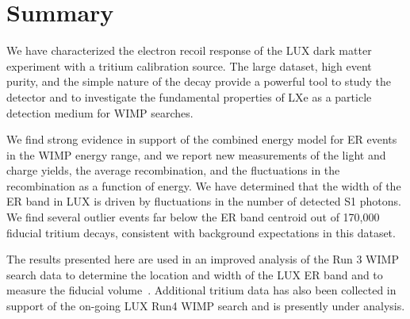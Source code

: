 \section{Summary}

We have characterized the electron recoil response of the LUX dark matter experiment with a tritium calibration source. The large dataset, high event purity, and the simple nature of the decay provide a powerful tool to study the detector and to investigate the fundamental properties of LXe as a particle detection medium for WIMP searches. 

We find strong evidence in support of the combined energy model for ER events in the WIMP energy range, and we report new measurements of the light and charge yields, the average recombination, and the fluctuations in the recombination as a function of energy. We have determined that the width of the ER band in LUX is driven by fluctuations in the number of detected S1 photons. We find several outlier events far below the ER band centroid out of 170,000 fiducial tritium decays, consistent with background expectations in this dataset.

The results presented here are used in an improved analysis of the Run 3 WIMP search data to determine the location and width of the LUX ER band and to measure the fiducial volume~\cite{lux-reanalysis}. Additional tritium data has also been collected in support of the on-going LUX Run4 WIMP search and is presently under analysis.